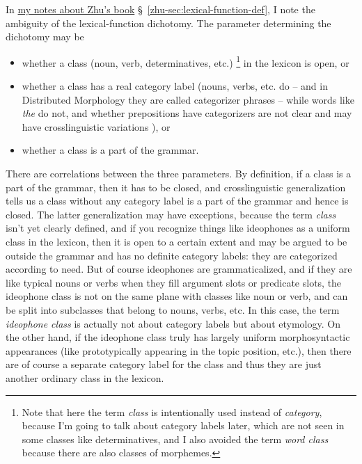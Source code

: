 \documentclass[UTF8, a4paper, oneside, scheme=plain]{ctexart}
\newcommand*{\citesec}[1]{\S~{#1}}
\newcommand*{\term}[1]{\emph{#1}}
\newcommand*{\corpus}[1]{\emph{#1}}
\newcommand{\zhudexi}{\href{../Chinese/reading-note-zhudexi.pdf}{my notes about Zhu's book}}
\begin{document}
In \zhudexi{} \citesec{\ref{zhu-sec:lexical-function-def}},
I note the ambiguity of the lexical-function dichotomy.
The parameter determining the dichotomy may be  
\begin{itemize}
    \item whether a class (noun, verb, determinatives, etc.)%
    \footnote{
        Note that here the term \term{class} is intentionally used instead of \term{category}, 
        because I'm going to talk about category labels later, 
        which are not seen in some classes like determinatives,
        and I also avoided the term \term{word class} because there are also classes of morphemes.
    }
    in the lexicon is open, or 
    \item whether a class has a real category label
    (nouns, verbs, etc. do -- and in Distributed Morphology they are called categorizer phrases -- 
    while words like \corpus{the} do not, and
    whether prepositions have categorizers are not clear
    and may have crosslinguistic variations \citep{deacon2014adpositions}), or 
    \item whether a class is a part of the grammar.
\end{itemize}
There are correlations between the three parameters.
By definition, if a class is a part of the grammar,
then it has to be closed,
and crosslinguistic generalization tells us 
a class without any category label is a part of the grammar 
and hence is closed.
The latter generalization may have exceptions,
because the term \term{class} isn't yet clearly defined,
and if you recognize things like ideophones as a uniform class in the lexicon,
then it is open to a certain extent 
and may be argued to be outside the grammar and has no definite category labels:
they are categorized according to need.
But of course ideophones are grammaticalized,
and if they are like typical nouns or verbs when they fill argument slots or predicate slots,
the ideophone class is not on the same plane with classes like noun or verb,
and can be split into subclasses that belong to nouns, verbs, etc.
In this case, the term \term{ideophone class} 
is actually not about category labels but about etymology.
On the other hand,
if the ideophone class truly has largely uniform morphosyntactic appearances
(like prototypically appearing in the topic position, etc.),
then there are of course a separate category label for the class 
and thus they are just another ordinary class in the lexicon.
\end{document}
